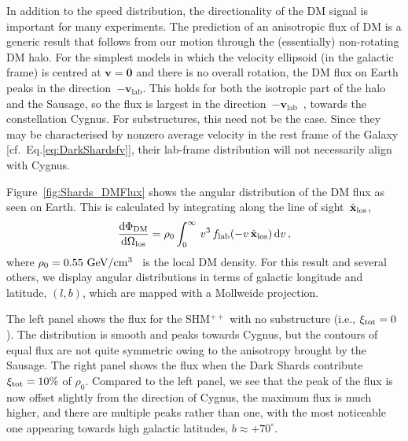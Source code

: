 \documentclass[prd,10pt,twocolumn,showpacs,nofootinbib,aps,superscriptaddress,preprintnumbers]{revtex4-1}
\newcommand{\eV}{\text{e\kern-0.15ex V}\xspace}
\newcommand{\GeV}{\text{G\eV}\xspace}
\newcommand{\vlab}{\mathbf{v}_\mathrm{lab}}
\newcommand{\SHMpp}{SHM$^{++}$\xspace}
\begin{document}
In addition to the speed distribution, the directionality of
the DM signal is important for many experiments.  The
prediction of an anisotropic flux of DM is a generic result that
follows from our motion through the (essentially) non-rotating DM
halo.  For the simplest models in which the velocity ellipsoid (in the
galactic frame) is centred at $\mathbf{v} = \mathbf{0}$ and there is
no overall rotation, the DM flux on Earth peaks in the
direction~$-\vlab$.  This holds for both the isotropic part of the halo and
the Sausage, so the flux is largest in the
direction~$-\vlab$~\cite{Evans:2018bqy}, towards the constellation Cygnus. For substructures, this need not be the case. Since they may be characterised by nonzero average velocity in the rest
frame of the Galaxy [cf.\ Eq.\eqref{eq:DarkShardsfv}], their
lab-frame distribution will not necessarily align with Cygnus.


  Figure~\ref{fig:Shards_DMFlux} shows the angular distribution of the
  DM flux as seen on Earth.  This is calculated by integrating
  along the line of sight~$\hat{\mathbf{x}}_{\rm los}$,
  \begin{equation}
  \frac{\textrm{d}\Phi_{\rm DM}}{\textrm{d}\Omega_{\rm los}} = \rho_0 \int_0^{\infty}\, v^3 \, f_{\rm lab}(-v\, \hat{\mathbf{x}}_{\rm los})\, \mathrm{d} v \, ,
  \end{equation}
  where $\rho_0=0.55~\mathrm{\GeV}/\mathrm{cm}^3$~\cite{Evans:2018bqy} is
  the local DM density. For this result and several others, we display
  angular distributions in terms of galactic longitude and latitude, $(l,b)$,
  which are mapped with a Mollweide projection.
  
  The left panel shows the flux for the \SHMpp with no substructure (i.e., $\xi_{\rm tot} = 0$).
The distribution is smooth and peaks towards Cygnus, but the contours of equal flux
are not quite symmetric owing to the anisotropy brought by the Sausage. 
The right panel shows the flux when the Dark
Shards contribute~$\xi_{\rm tot} = 10\%$ of $\rho_0$. Compared to the left
panel, we see that the peak of the flux is now offset slightly from
the direction of Cygnus, the maximum flux is much higher, and
there are multiple peaks rather than one, with the most
noticeable one appearing towards high galactic latitudes, $b \approx +70^\circ$.
\end{document}
